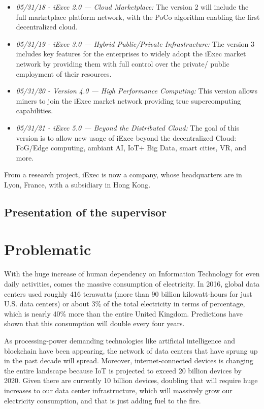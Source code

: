 \begin{itemize}
    \item\textit{05/31/18 - iExec 2.0 — Cloud Marketplace: }
    The version 2 will include the full marketplace platform network, with the PoCo algorithm enabling the first decentralized cloud.

    \item\textit{05/31/19 - iExec 3.0 — Hybrid Public/Private Infrastructure: }
    The version 3 includes key features for the enterprises to widely adopt the iExec market network by providing them with full control over the private/ public employment of their resources.

    \item\textit{05/31/20 - Version 4.0 — High Performance Computing: }
    This version allows miners to join the iExec market network providing true supercomputing capabilities.

    \item\textit{05/31/21 - iExec 5.0 — Beyond the Distributed Cloud: }
    The goal of this version is to allow new usage of iExec beyond the decentralized Cloud: FoG/Edge computing, ambiant AI, IoT+ Big Data, smart cities, VR, and more.

  \end{itemize}

  From a research project, iExec is now a company, whose headquarters are in Lyon, France, with a
  subsidiary in Hong Kong.

  \subsection{Presentation of the supervisor}

\section{Problematic}
  With the huge increase of human dependency on Information Technology for even daily activities,
  comes the massive consumption of electricity. In 2016, global data centers used roughly 416
  terawatts (more than 90 billion kilowatt-hours for just U.S. data centers) or about 3\% of the
  total electricity in terms of percentage, which is nearly 40\% more than the entire United Kingdom.
  Predictions have shown that this consumption will double every four years\cite{consumption-prediction}.

  As processing-power demanding technologies like artificial intelligence and blockchain have
  been appearing, the network of data centers that have sprung up in the past decade will spread.
  Moreover, internet-connected devices is changing the entire landscape because IoT is
  projected to exceed 20 billion devices by 2020. Given there are currently 10 billion devices,
  doubling that will require huge increases to our data center infrastructure, which will
  massively grow our electricity consumption, and that is just adding fuel to the fire.

